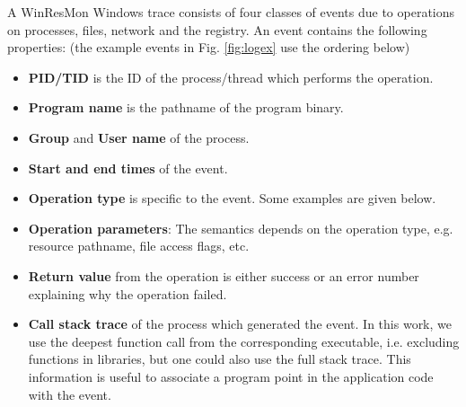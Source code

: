 A WinResMon Windows trace consists of four classes of events
due to operations on processes, files, network and the registry.
An event contains the following properties: (the example events
in Fig. \ref{fig:logex} use the ordering below)
\begin{itemize}
\item {\bf PID/TID} is the ID of the process/thread which 
performs the operation.
\item {\bf Program name} is the pathname of the program binary.
\item {\bf Group} and {\bf User name} of the process.
\item {\bf Start and end times} of the event.
\item {\bf Operation type} is specific to the event.
Some examples are given below.
\item {\bf Operation parameters}: The semantics depends on the operation type,
e.g.  resource pathname, file access flags, etc.
\item {\bf Return value} from the operation
is either success or an error number explaining why the operation failed.
\item {\bf Call stack trace} of the process which generated the event.
In this work, we use the deepest function call 
from the corresponding executable, i.e. 
excluding functions in libraries,
but one could also use the full stack trace.
This information is useful to associate a program point in the
application code with the event.
\end{itemize}

